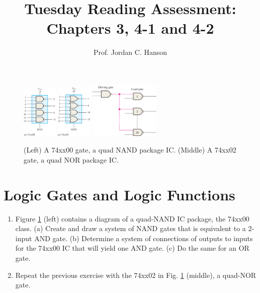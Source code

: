 \documentclass{article}
\begin{document}
\title{Tuesday Reading Assessment: Chapters 3, 4-1 and 4-2}
\author{Prof. Jordan C. Hanson}

\maketitle

\begin{figure}[ht]
\centering
\includegraphics[width=0.15\textwidth]{figures/quad_nand.jpg} \hspace{1cm}
\includegraphics[width=0.15\textwidth]{figures/quad_nor.jpg} \hspace{1cm}
\includegraphics[width=0.3\textwidth]{figures/fan.jpg}
\caption{\label{fig:gates} (Left) A 74xx00 gate, a quad NAND package IC. (Middle) A 74xx02 gate, a quad NOR package IC.}
\end{figure}

\section{Logic Gates and Logic Functions}

\begin{enumerate}
\item Figure \ref{fig:gates} (left) contains a diagram of a quad-NAND IC package, the 74xx00 class.  (a) Create and draw a system of NAND gates that is equivalent to a 2-input AND gate.  (b) Determine a system of connections of outputs to inputs for the 74xx00 IC that will yield one AND gate. (c) Do the same for an OR gate. \\ \vspace{2cm}
\item Repeat the previous exercise with the 74xx02 in Fig. \ref{fig:gates} (middle), a quad-NOR gate. \\ \vspace{1.5cm}
\end{enumerate}
\end{document}
